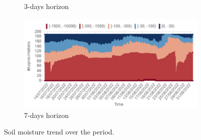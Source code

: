 \begin{figure}[t]
\begin{subfigure}[b]{0.47\textwidth}
        \caption{3-days horizon}
        \label{orchard-fig:stacked_c}
    \end{subfigure}
    \hfill
    \begin{subfigure}[b]{0.47\textwidth}
        \includegraphics[width=\textwidth]{chapters/physics-aware/orchard/img/7gg_stacked.pdf}
        \caption{7-days horizon}
        \label{orchard-fig:stacked_d}
    \end{subfigure}
    \caption{Soil moisture trend over the period.}
    \label{orchard-fig:stacked}
\end{figure}

